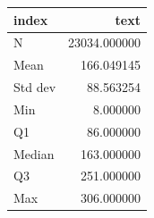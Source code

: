 \begin{tabular}{lr}
\toprule
index & text \\
\midrule
N & 23034.000000 \\
Mean & 166.049145 \\
Std dev & 88.563254 \\
Min & 8.000000 \\
Q1 & 86.000000 \\
Median & 163.000000 \\
Q3 & 251.000000 \\
Max & 306.000000 \\
\bottomrule
\end{tabular}
